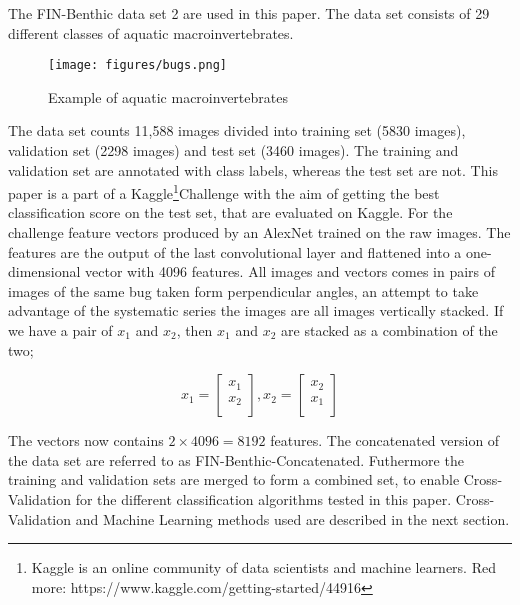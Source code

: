 The FIN-Benthic \cite{finbenthic} data set 2 are used in this paper. The data set consists of 29 different classes of aquatic macroinvertebrates. 

\begin{figure}[H]
    \centering
    \texttt{[image: figures/bugs.png]}
    \caption{Example of aquatic macroinvertebrates}
\end{figure}

The data set counts 11,588 images divided into training set (5830 images), validation set (2298 images) and test set (3460 images). The training and validation set are annotated with class labels, whereas the test set are not. This paper is a part of a Kaggle\footnote{Kaggle is an online community of data scientists and machine learners. Red more: https://www.kaggle.com/getting-started/44916}Challenge with the aim of getting the best classification score on the test set, that are evaluated on Kaggle. For the challenge feature vectors produced by an AlexNet\cite{Krizhevsky:2012} trained on the raw images. The features are the output of the last convolutional layer and flattened into a one-dimensional vector with 4096 features. All images and vectors comes in pairs of images of the same bug taken form perpendicular angles, an attempt to take advantage of the systematic series the images are all images vertically stacked. If we have a pair of $x_1$ and $x_2$, then $x_1$ and $x_2$ are stacked as a combination of the two; 

$$x_1=\begin{bmatrix} x_{1} \\ x_{2} \\ \end{bmatrix}, x_2 = \begin{bmatrix} x_{2} \\ x_{1} \\ \end{bmatrix}$$

The vectors now contains $2 \times 4096 = 8192$ features. The concatenated version of the data set are referred to as FIN-Benthic-Concatenated. Futhermore the training and validation sets are merged to form a combined set, to enable Cross-Validation for the different classification algorithms tested in this paper. Cross-Validation and Machine Learning methods used are described in the next section.
